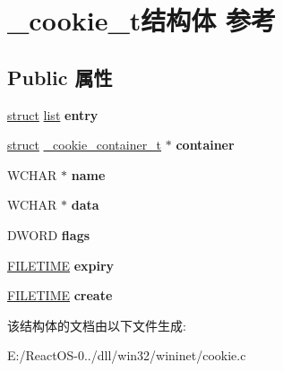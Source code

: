 \hypertarget{struct__cookie__t}{}\section{\+\_\+cookie\+\_\+t结构体 参考}
\label{struct__cookie__t}
\subsection*{Public 属性}
\begin{DoxyCompactItemize}
\item 
\mbox{\label{struct__cookie__t_a08016d1f265f612837afe7c7f7205319}} 
\hyperlink{interfacestruct}{struct} \hyperlink{classlist}{list} {\bfseries entry}
\item 
\mbox{\label{struct__cookie__t_ab32f686ebd4ce3c73f64678cd323f124}} 
\hyperlink{interfacestruct}{struct} \hyperlink{struct__cookie__container__t}{\+\_\+cookie\+\_\+container\+\_\+t} $\ast$ {\bfseries container}
\item 
\mbox{\label{struct__cookie__t_a913267fe10f52779ff4b0f96416fadab}} 
W\+C\+H\+AR $\ast$ {\bfseries name}
\item 
\mbox{\label{struct__cookie__t_a3050b38cd96f738ea0cce2d98b6cbd5e}} 
W\+C\+H\+AR $\ast$ {\bfseries data}
\item 
\mbox{\label{struct__cookie__t_a518619a1e7a48ae1d595cc61fadc9310}} 
D\+W\+O\+RD {\bfseries flags}
\item 
\mbox{\label{struct__cookie__t_aaa0303d0df60afabbb72ac7bfddb7fbd}} 
\hyperlink{struct___f_i_l_e_t_i_m_e}{F\+I\+L\+E\+T\+I\+ME} {\bfseries expiry}
\item 
\mbox{\label{struct__cookie__t_afda337ddbdc8cffc822839fc9a276220}} 
\hyperlink{struct___f_i_l_e_t_i_m_e}{F\+I\+L\+E\+T\+I\+ME} {\bfseries create}
\end{DoxyCompactItemize}


该结构体的文档由以下文件生成\+:\begin{DoxyCompactItemize}
\item 
E\+:/\+React\+O\+S-\/0../dll/win32/wininet/cookie.\+c\end{DoxyCompactItemize}
